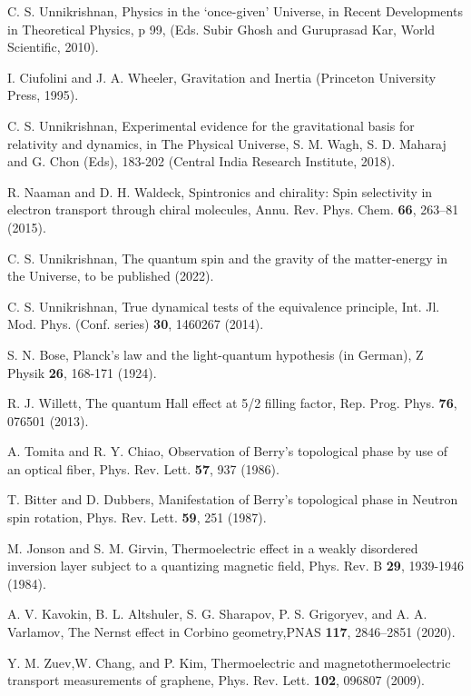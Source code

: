 \documentclass[aps,preprint,12pt,tightenlines]{revtex4}%
\begin{document}
\begin{thebibliography}{99}
C. S. Unnikrishnan, Physics in the `once-given' Universe,
in Recent Developments in Theoretical Physics, p 99, (Eds. Subir Ghosh and
Guruprasad Kar, World Scientific, 2010).

I. Ciufolini and J. A. Wheeler, Gravitation and Inertia
(Princeton University Press, 1995).

C. S. Unnikrishnan, Experimental evidence for the
gravitational basis for relativity and dynamics, in The Physical Universe, S.
M. Wagh, S. D. Maharaj and G. Chon (Eds), 183-202 (Central India Research
Institute, 2018).

R. Naaman and D. H. Waldeck, Spintronics and chirality: Spin
selectivity in electron transport through chiral molecules, Annu. Rev. Phys.
Chem. \textbf{66}, 263--81 (2015).

C. S. Unnikrishnan, The quantum spin and the gravity of the
matter-energy in the Universe, to be published (2022).

C. S. Unnikrishnan, True dynamical tests of the equivalence
principle, Int. Jl. Mod. Phys. (Conf. series) \textbf{30}, 1460267 (2014).

S. N. Bose, Planck's law and the light-quantum hypothesis
(in German), Z Physik \textbf{26}, 168-171 (1924).

R. J. Willett, The quantum Hall effect at 5/2
filling factor, Rep. Prog. Phys. \textbf{76}, 076501 (2013).

A. Tomita and R. Y. Chiao, Observation of Berry's
topological phase by use of an optical fiber, Phys. Rev. Lett. \textbf{57},
937 (1986).

T. Bitter and D. Dubbers, Manifestation of
Berry's topological phase in Neutron spin rotation, Phys. Rev. Lett.
\textbf{59}, 251 (1987).

M. Jonson and S. M. Girvin, Thermoelectric effect in a
weakly disordered inversion layer subject to a quantizing magnetic field,
Phys. Rev. B \textbf{29}, 1939-1946 (1984).

A. V. Kavokin, B. L. Altshuler, S. G. Sharapov, P. S.
Grigoryev, and A. A. Varlamov, The Nernst effect in Corbino geometry,PNAS
\textbf{117}, 2846--2851 (2020).

Y. M. Zuev,W. Chang, and P. Kim, Thermoelectric and
magnetothermoelectric transport measurements of graphene, Phys. Rev. Lett.
\textbf{102}, 096807 (2009).


\end{thebibliography}
\end{document}
